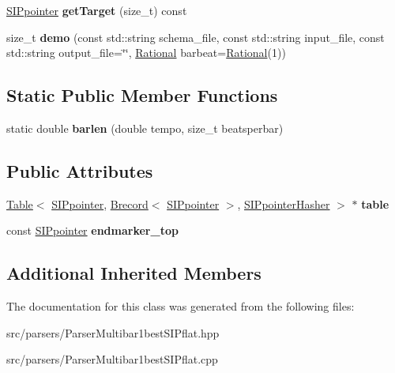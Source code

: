 \begin{DoxyCompactItemize}
\mbox{\label{classParserMultibar1bestSIPflat_a90b5fbee0c2e6204f6952e2ff9e67159}} 
\mbox{\hyperlink{classSIPpointer}{S\+I\+Ppointer}} {\bfseries get\+Target} (size\+\_\+t) const
\item 
\mbox{\label{classParserMultibar1bestSIPflat_ad4171ad776117539a29a319c210ebe1f}} 
size\+\_\+t {\bfseries demo} (const std\+::string schema\+\_\+file, const std\+::string input\+\_\+file, const std\+::string output\+\_\+file=\char`\"{}\char`\"{}, \mbox{\hyperlink{classRational}{Rational}} barbeat=\mbox{\hyperlink{classRational}{Rational}}(1))
\end{DoxyCompactItemize}
\subsection*{Static Public Member Functions}
\begin{DoxyCompactItemize}
\item 
\mbox{\label{classParserMultibar1bestSIPflat_aebb38fc665a77a0b995ce05dbaef97cd}} 
static double {\bfseries barlen} (double tempo, size\+\_\+t beatsperbar)
\end{DoxyCompactItemize}
\subsection*{Public Attributes}
\begin{DoxyCompactItemize}
\item 
\mbox{\label{classParserMultibar1bestSIPflat_a11bcc66d2912ad91eb6824bf3a462794}} 
\mbox{\hyperlink{classTable}{Table}}$<$ \mbox{\hyperlink{classSIPpointer}{S\+I\+Ppointer}}, \mbox{\hyperlink{classBrecord}{Brecord}}$<$ \mbox{\hyperlink{classSIPpointer}{S\+I\+Ppointer}} $>$, \mbox{\hyperlink{structSIPpointerHasher}{S\+I\+Ppointer\+Hasher}} $>$ $\ast$ {\bfseries table}
\item 
\mbox{\label{classParserMultibar1bestSIPflat_a6316e5ab8217f4258bf27902a90f8735}} 
const \mbox{\hyperlink{classSIPpointer}{S\+I\+Ppointer}} {\bfseries endmarker\+\_\+top}
\end{DoxyCompactItemize}
\subsection*{Additional Inherited Members}


The documentation for this class was generated from the following files\+:\begin{DoxyCompactItemize}
\item 
src/parsers/Parser\+Multibar1best\+S\+I\+Pflat.\+hpp\item 
src/parsers/Parser\+Multibar1best\+S\+I\+Pflat.\+cpp\end{DoxyCompactItemize}
